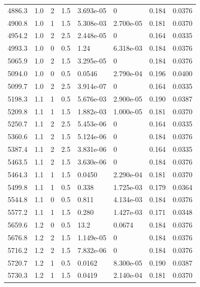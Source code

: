 \documentclass[preview]{standalone}
\begin{document}
{{{{\begin{tabular}{L{1.2cm}C{1.2cm} C{0.3cm}C{0.5cm} C{1.4cm}C{1.4cm} C{1.4cm}C{1.4cm}}
  4886.3  &   1.0  & 2     & 1.5 &  3.693e-05  & 0  & 0.184 &  0.0376   \\ 
  4900.8  &   1.0  & 1     & 1.5 &  5.308e-03  & 2.700e-05  & 0.181 &  0.0370   \\ 
  4954.2  &   1.0  & 2     & 2.5 &  2.448e-05  & 0  & 0.164 &  0.0335   \\ 
  4993.3  &   1.0  & 0     & 0.5 &  1.24  & 6.318e-03  & 0.184 &  0.0376   \\ 
  5065.9  &   1.0  & 2     & 1.5 &  3.295e-05  & 0  & 0.184 &  0.0376   \\ 
  5094.0  &   1.0  & 0     & 0.5 &  0.0546  & 2.790e-04  & 0.196 &  0.0400   \\ 
  5099.7  &   1.0  & 2     & 2.5 &  3.914e-07  & 0  & 0.164 &  0.0335   \\ 
  5198.3  &   1.1  & 1     & 0.5 &  5.676e-03  & 2.900e-05  & 0.190 &  0.0387   \\ 
  5209.8  &   1.1  & 1     & 1.5 &  1.882e-03  & 1.000e-05  & 0.181 &  0.0370   \\ 
  5250.7  &   1.1  & 2     & 2.5 &  5.453e-06  & 0  & 0.164 &  0.0335   \\ 
  5360.6  &   1.1  & 2     & 1.5 &  5.124e-06  & 0  & 0.184 &  0.0376   \\ 
  5387.4  &   1.1  & 2     & 2.5 &  3.831e-06  & 0  & 0.164 &  0.0335   \\ 
  5463.5  &   1.1  & 2     & 1.5 &  3.630e-06  & 0  & 0.184 &  0.0376   \\ 
  5464.3  &   1.1  & 1     & 1.5 &  0.0450  & 2.290e-04  & 0.181 &  0.0370   \\ 
  5499.8  &   1.1  & 1     & 0.5 &  0.338  & 1.725e-03  & 0.179 &  0.0364   \\ 
  5544.8  &   1.1  & 0     & 0.5 &  0.811  & 4.134e-03  & 0.184 &  0.0376   \\ 
  5577.2  &   1.1  & 1     & 1.5 &  0.280  & 1.427e-03  & 0.171 &  0.0348   \\ 
  5659.6  &   1.2  & 0     & 0.5 &  13.2  & 0.0674  & 0.184 &  0.0376   \\ 
  5676.8  &   1.2  & 2     & 1.5 &  1.149e-05  & 0  & 0.184 &  0.0376   \\ 
  5716.2  &   1.2  & 2     & 1.5 &  7.832e-06  & 0  & 0.184 &  0.0376   \\ 
  5720.7  &   1.2  & 1     & 0.5 &  0.0162  & 8.300e-05  & 0.190 &  0.0387   \\ 
  5730.3  &   1.2  & 1     & 1.5 &  0.0419  & 2.140e-04  & 0.181 &  0.0370   \\ 

\end{tabular}}}}}
\end{document}
